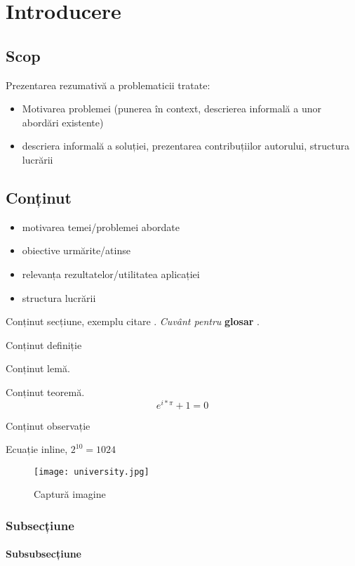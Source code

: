 \chapter{Introducere}

\section{Scop}
Prezentarea rezumativă a problematicii tratate:
\begin{itemize}
	\item Motivarea problemei (punerea în context, descrierea informală a unor abordări existente)
	\item descriera informală a soluției, prezentarea contribuțiilor autorului, structura lucrării
\end{itemize}
\section{Conținut}
\begin{itemize}
	\item motivarea temei/problemei abordate
	\item obiective urmărite/atinse
	\item relevanța rezultatelor/utilitatea aplicației
	\item structura lucrării
\end{itemize}
\p


Conținut secțiune, exemplu citare \cite{hoare_csp}.
\textit{Cuvânt pentru} \textbf{glosar} .	

\begin{definition}
	Conținut definiție
\end{definition}

\begin{lemma}
	Conținut lemă.
\end{lemma}

\begin{theorem}
	Conținut teoremă.
	\[
		e^{i * \pi} + 1 = 0
	\]
\end{theorem}

\begin{remark}
	Conținut observație
\end{remark}

Ecuație inline, $2^{10} = 1024 $

\begin{figure}[h]
	\begin{center}
			\texttt{[image: university.jpg]}
	\end{center}
	\caption{Captură imagine}
\end{figure}


\subsection{Subsecțiune}

\subsubsection{Subsubsecțiune}